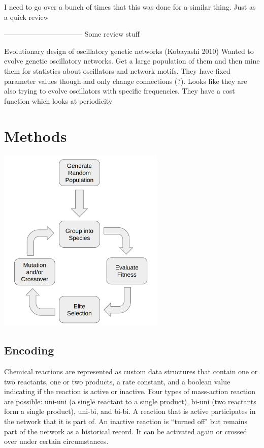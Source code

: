 \documentclass[12pt]{report}
\begin{document}
I need to go over a bunch of times that this was done for a similar thing. Just as a quick review


---------------------------------
Some review stuff


Evolutionary design of oscillatory genetic networks (Kobayashi 2010)
Wanted to evolve genetic oscillatory networks. Get a large population of them and then mine them for statistics about oscillators and network motifs. They have fixed parameter values though and only change connections (?). Looks like they are also trying to evolve oscillators with specific frequencies. They have a cost function which looks at periodicity




\section{Methods}

\begin{center}
    \includegraphics[width=8cm]{images/algo_description_crossover.png}
    \label{fig:algo_description_crossover}
\end{center}
\subsection{Encoding}
Chemical reactions are represented as custom data structures that contain one or two reactants, one or two products, a rate constant, and a boolean value indicating if the reaction is active or inactive. Four types of mass-action reaction are possible: uni-uni (a single reactant to a single product), bi-uni (two reactants form a single product), uni-bi, and bi-bi. A reaction that is active participates in the network that it is part of. An inactive reaction is ``turned off" but remains part of the network as a historical record. It can be activated again or crossed over under certain circumstances. 
\end{document}

